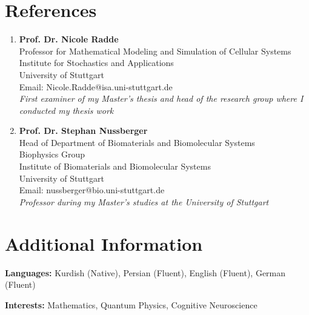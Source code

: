 \documentclass[a4paper,11pt]{article}
\begin{document}
\vspace{-6mm}


\section{\textbf{References}}
\vspace{-0.2mm}
\small{
\begin{enumerate}[leftmargin=*,labelsep=2mm]

\item \textbf{Prof. Dr. Nicole Radde}\\
Professor for Mathematical Modeling and Simulation of Cellular Systems\\
Institute for Stochastics and Applications\\
University of Stuttgart\\
Email: Nicole.Radde@isa.uni-stuttgart.de\\
\textit{First examiner of my Master's thesis and head of the research group where I conducted my thesis work}

\item \textbf{Prof. Dr. Stephan Nussberger}\\
Head of Department of Biomaterials and Biomolecular Systems\\
Biophysics Group\\
Institute of Biomaterials and Biomolecular Systems\\
University of Stuttgart\\
Email: nussberger@bio.uni-stuttgart.de\\
\textit{Professor during my Master's studies at the University of Stuttgart}
\end{enumerate}
}



\vspace{-6mm}


\section{\textbf{Additional Information}}
\vspace{-0.4mm}
\small{
\textbf{Languages:} Kurdish (Native), Persian (Fluent), English (Fluent), German (Fluent)

\textbf{Interests:} Mathematics, Quantum Physics, Cognitive Neuroscience}


\newpage
\end{document}
